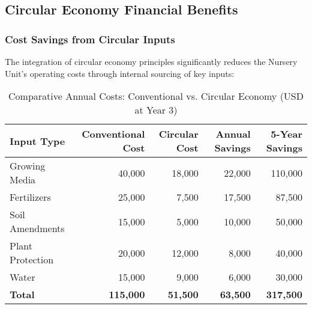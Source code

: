 \subsection{Circular Economy Financial Benefits} \label{sec:circular_economy_benefits}

\subsubsection{Cost Savings from Circular Inputs}
The integration of circular economy principles significantly reduces the Nursery Unit's operating costs through internal sourcing of key inputs:

\begin{table}[h]
\centering
\begin{tabular}{|l|r|r|r|r|}
\hline
\textbf{Input Type} & \textbf{Conventional Cost} & \textbf{Circular Cost} & \textbf{Annual Savings} & \textbf{5-Year Savings} \\
\hline
Growing Media & 40,000 & 18,000 & 22,000 & 110,000 \\
Fertilizers & 25,000 & 7,500 & 17,500 & 87,500 \\
Soil Amendments & 15,000 & 5,000 & 10,000 & 50,000 \\
Plant Protection & 20,000 & 12,000 & 8,000 & 40,000 \\
Water & 15,000 & 9,000 & 6,000 & 30,000 \\
\hline
\textbf{Total} & \textbf{115,000} & \textbf{51,500} & \textbf{63,500} & \textbf{317,500} \\
\hline
\end{tabular}
\caption{Comparative Annual Costs: Conventional vs. Circular Economy (USD at Year 3)}
\end{table}

